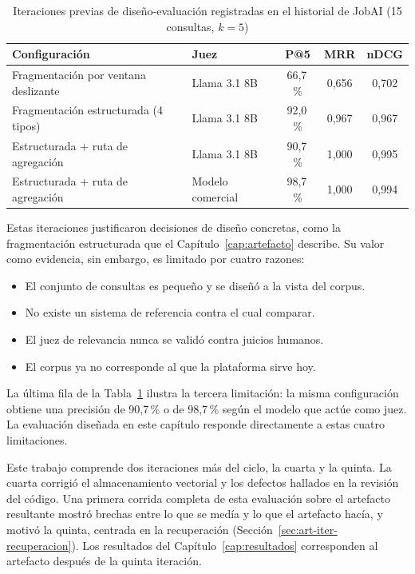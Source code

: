 \begin{table}[htbp!]
    \centering
    \caption{Iteraciones previas de diseño-evaluación registradas en el historial de JobAI (15 consultas, $k=5$)}
    \label{tab:met-iteraciones}
    \begin{tabular}{|p{6.2cm}|p{2.6cm}|c|c|c|}
        \hline
        \textbf{Configuración} & \textbf{Juez} & \textbf{P@5} & \textbf{MRR} & \textbf{nDCG} \\
        \hline
        Fragmentación por ventana deslizante & Llama 3.1 8B & 66,7\,\% & 0,656 & 0,702 \\
        \hline
        Fragmentación estructurada (4 tipos) & Llama 3.1 8B & 92,0\,\% & 0,967 & 0,967 \\
        \hline
        Estructurada + ruta de agregación & Llama 3.1 8B & 90,7\,\% & 1,000 & 0,995 \\
        \hline
        Estructurada + ruta de agregación & Modelo comercial & 98,7\,\% & 1,000 & 0,994 \\
        \hline
    \end{tabular}
\end{table}

Estas iteraciones justificaron decisiones de diseño concretas, como la fragmentación estructurada que el Capítulo~\ref{cap:artefacto} describe. Su valor como evidencia, sin embargo, es limitado por cuatro razones:
\begin{itemize}
    \item El conjunto de consultas es pequeño y se diseñó a la vista del corpus.
    \item No existe un sistema de referencia contra el cual comparar.
    \item El juez de relevancia nunca se validó contra juicios humanos.
    \item El corpus ya no corresponde al que la plataforma sirve hoy.
\end{itemize}
La última fila de la Tabla~\ref{tab:met-iteraciones} ilustra la tercera limitación: la misma configuración obtiene una precisión de 90,7\,\% o de 98,7\,\% según el modelo que actúe como juez. La evaluación diseñada en este capítulo responde directamente a estas cuatro limitaciones.

Este trabajo comprende dos iteraciones más del ciclo, la cuarta y la quinta. La cuarta corrigió el almacenamiento vectorial y los defectos hallados en la revisión del código. Una primera corrida completa de esta evaluación sobre el artefacto resultante mostró brechas entre lo que se medía y lo que el artefacto hacía, y motivó la quinta, centrada en la recuperación (Sección~\ref{sec:art-iter-recuperacion}). Los resultados del Capítulo~\ref{cap:resultados} corresponden al artefacto después de la quinta iteración.

